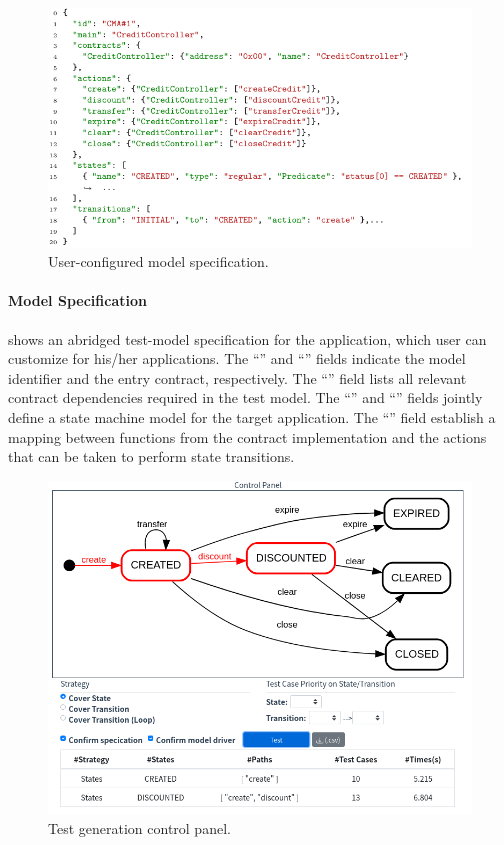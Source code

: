 \begin{figure}[t]
	\centering
	\includegraphics[width=0.9\columnwidth,trim=0 10pt 0 10pt, clip]{Figures/Chapter3/modelSpecification.pdf}
	\caption{User-configured model specification.}
	\label{fig:specification}
\end{figure}

\paragraph{Model Specification}
 shows an abridged test-model specification for the \wecredit application, which user can customize for his/her applications.
The ``'' and ``'' fields indicate the model identifier and the entry contract,
respectively.
The ``'' field lists all relevant contract dependencies required in the test model.
The ``'' and ``'' fields jointly define a state machine model for
the target application.
The ``'' field establish a mapping between functions from the contract implementation
and the actions that can be taken to perform state transitions.

\begin{figure}[t]
	\centering
	\includegraphics[width=.79\columnwidth]{Figures/Chapter3/modcon-test.png}
	\caption{Test generation control panel.}
	\label{fig:modcon-test}
\end{figure}


